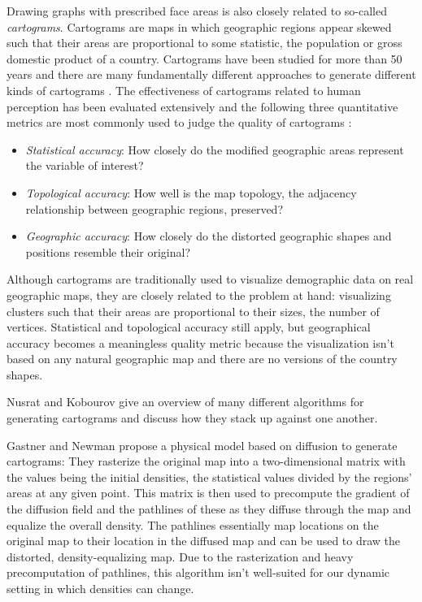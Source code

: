 Drawing graphs with prescribed face areas is also closely related to so-called \emph{cartograms}. Cartograms are maps in which geographic regions appear skewed such that their areas are proportional to some statistic, \eg{} the population or gross domestic product of a country. Cartograms have been studied for more than 50 years \cite{tobler2004thirty} and there are many fundamentally different approaches to generate different kinds of cartograms \cite{nusrat2016state}. The effectiveness of cartograms related to human perception has been evaluated extensively \cite{nusrat2018evaluating} and the following three quantitative metrics are most commonly used to judge the quality of cartograms \cite{nusrat2016state} \cite{alam2015quantitative} \cite{nusrat2018evaluating}:
%
\begin{itemize}
	\item \emph{Statistical accuracy}: How closely do the modified geographic areas represent the variable of interest?
	\item \emph{Topological accuracy}: How well is the map topology, \ie{} the adjacency relationship between geographic regions, preserved?
	\item \emph{Geographic accuracy}: How closely do the distorted geographic shapes and positions resemble their original?
\end{itemize}

Although cartograms are traditionally used to visualize demographic data on real geographic maps, they are closely related to the problem at hand: visualizing clusters such that their areas are proportional to their sizes, \ie{} the number of vertices. Statistical and topological accuracy still apply, but geographical accuracy becomes a meaningless quality metric because the visualization isn't based on any natural geographic map and there are no  versions of the country shapes.

Nusrat and Kobourov \cite{nusrat2016state} give an overview of many different algorithms for generating cartograms and discuss how they stack up against one another.

Gastner and Newman \cite{gastner2004diffusion} propose a physical model based on diffusion to generate cartograms: They rasterize the original map into a two-dimensional matrix with the values being the initial densities, \ie{} the statistical values divided by the regions' areas at any given point. This matrix is then used to precompute the gradient of the diffusion field and the pathlines of these  as they diffuse through the map and equalize the overall density. The pathlines essentially map locations on the original map to their location in the diffused map and can be used to draw the distorted, density-equalizing map. Due to the rasterization and heavy precomputation of pathlines, this algorithm isn't well-suited for our dynamic setting in which densities can change.

